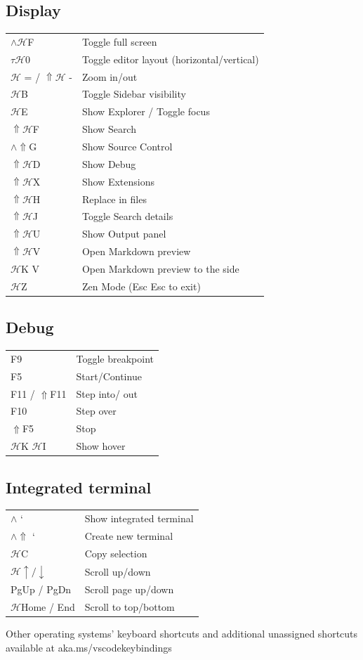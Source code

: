 \documentclass[UTF8]{article}
\begin{document}
\subsection*{Display}
\begin{tabular}{ll}
$\wedge\mathscr{H}$F & Toggle full screen \\
$\tau\mathscr{H}$0 & Toggle editor layout (horizontal/vertical) \\
$\mathscr{H}$ = / $\Uparrow\mathscr{H}$ - & Zoom in/out \\
$\mathscr{H}$B & Toggle Sidebar visibility \\
$\mathscr{H}$E & Show Explorer / Toggle focus \\
$\Uparrow\mathscr{H}$F & Show Search \\
$\wedge\Uparrow$G & Show Source Control \\
$\Uparrow\mathscr{H}$D & Show Debug \\
$\Uparrow\mathscr{H}$X & Show Extensions \\
$\Uparrow\mathscr{H}$H & Replace in files \\
$\Uparrow\mathscr{H}$J & Toggle Search details \\
$\Uparrow\mathscr{H}$U & Show Output panel \\
$\Uparrow\mathscr{H}$V & Open Markdown preview \\
$\mathscr{H}$K V & Open Markdown preview to the side \\
$\mathscr{H}$Z & Zen Mode (Esc Esc to exit) \\
\end{tabular}

\subsection*{Debug}
\begin{tabular}{ll}
F9 & Toggle breakpoint \\
F5 & Start/Continue \\
F11 / $\Uparrow$F11 & Step into/ out \\
F10 & Step over \\
$\Uparrow$F5 & Stop \\
$\mathscr{H}$K $\mathscr{H}$I & Show hover \\
\end{tabular}

\subsection*{Integrated terminal}
\begin{tabular}{ll}
$\wedge$ ` & Show integrated terminal \\
$\wedge\Uparrow$ ` & Create new terminal \\
$\mathscr{H}$C & Copy selection \\
$\mathscr{H}\uparrow / \downarrow$ & Scroll up/down \\
PgUp / PgDn & Scroll page up/down \\
$\mathscr{H}$Home / End & Scroll to top/bottom \\
\end{tabular}

Other operating systems' keyboard shortcuts and additional unassigned shortcuts available at aka.ms/vscodekeybindings
\end{document}
